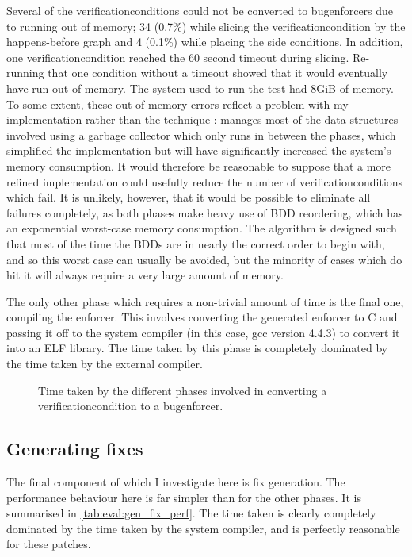 Several of the \glspl{verificationcondition} could not be converted to
\glspl{bugenforcer} due to running out of memory; 34 (0.7\%) while
slicing the \gls{verificationcondition} by the happens-before graph
and 4 (0.1\%) while placing the side conditions.  In addition, one
\gls{verificationcondition} reached the 60 second timeout during
slicing.  Re-running that one condition without a timeout showed that
it would eventually have run out of memory.  The system used to run
the test had 8GiB of memory.  To some extent, these out-of-memory
errors reflect a problem with my implementation {\implementation}
rather than the technique {\technique}: {\implementation} manages most
of the data structures involved using a garbage collector which only
runs in between the phases, which simplified the implementation but
will have significantly increased the system's memory consumption.  It
would therefore be reasonable to suppose that a more refined
implementation could usefully reduce the number of
\glspl{verificationcondition} which fail.  It is unlikely, however,
that it would be possible to eliminate all failures completely, as
both phases make heavy use of BDD reordering, which has an exponential
worst-case memory consumption.  The algorithm is designed such that
most of the time the BDDs are in nearly the correct order to begin
with, and so this worst case can usually be avoided, but the minority
of cases which do hit it will always require a very large amount of
memory.

The only other phase which requires a non-trivial amount of time is
the final one, compiling the enforcer.  This involves converting the
generated enforcer to C and passing it off to the system compiler (in
this case, gcc version 4.4.3) to convert it into an ELF library.  The
time taken by this phase is completely dominated by the time taken by
the external compiler.

\begin{figure}
  \caption{Time taken by the different phases involved in converting a
    \gls{verificationcondition} to a \gls{bugenforcer}.}
  \label{fig:eval:time_breakdown:convert_to_enforcer}
\end{figure}

\subsection{Generating fixes}
\label{sect:eval:genfix}

The final component of {\technique} which I investigate here is fix
generation.  The performance behaviour here is far simpler than for
the other phases.  It is summarised in
\autoref{tab:eval:gen_fix_perf}.  The time taken is clearly completely
dominated by the time taken by the system compiler, and is perfectly
reasonable for these patches.

